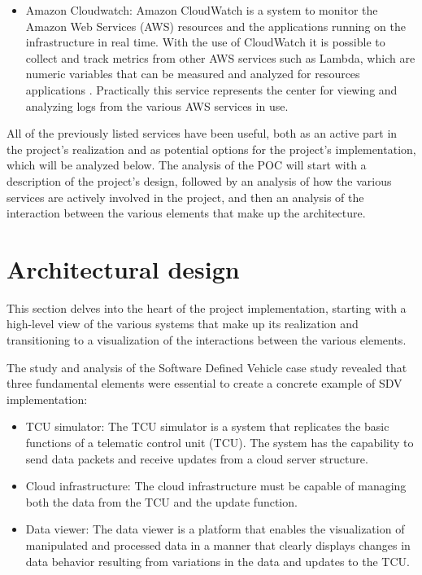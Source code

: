 \begin{itemize}
    \item Amazon Cloudwatch: Amazon CloudWatch is a system to monitor the Amazon Web Services (AWS) resources and the applications running on the infrastructure in real time. With the use of CloudWatch it is possible to collect and track metrics from other AWS services such as Lambda, which are numeric variables that can be measured and analyzed for resources applications \cite{AWSCloudwatch}. Practically this service represents the center for viewing and analyzing logs from the various AWS services in use.
\end{itemize}

All of the previously listed services have been useful, both as an active part in the project's realization and as potential options for the project's implementation, which will be analyzed below. The analysis of the POC will start with a description of the project's design, followed by an analysis of how the various services are actively involved in the project, and then an analysis of the interaction between the various elements that make up the architecture.

\section{Architectural design}
This section delves into the heart of the project implementation, starting with a high-level view of the various systems that make up its realization and transitioning to a visualization of the interactions between the various elements.

The study and analysis of the Software Defined Vehicle case study revealed that three fundamental elements were essential to create a concrete example of SDV implementation:
\begin{itemize}
    \item TCU simulator: The TCU simulator is a system that replicates the basic functions of a telematic control unit (TCU). The system has the capability to send data packets and receive updates from a cloud server structure.
    \item Cloud infrastructure: The cloud infrastructure must be capable of managing both the data from the TCU and the update function.
    \item Data viewer:  The data viewer is a platform that enables the visualization of manipulated and processed data in a manner that clearly displays changes in data behavior resulting from variations in the data and updates to the TCU.
\end{itemize}

